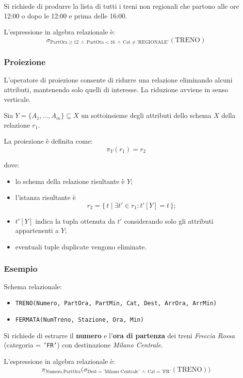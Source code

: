 Si richiede di produrre la lista di tutti i treni non regionali che
partono alle ore 12:00 o dopo le 12:00 e prima delle 16:00.

L'espressione in algebra relazionale è:
\[
\sigma_{\text{PartOra} \ge 12 \;\land\; \text{PartOra} < 16 \;\land\;
	\text{Cat} \neq \text{'REGIONALE'}}(\text{TRENO})
\]
\subsubsection{Proiezione}

L'operatore di proiezione consente di ridurre una relazione eliminando
alcuni attributi, mantenendo solo quelli di interesse.  
La riduzione avviene in senso verticale.

Sia $Y = \{A_1, \dots, A_m\} \subseteq X$ un sottoinsieme degli attributi
dello schema $X$ della relazione $r_1$.

La proiezione è definita come:
\[
\pi_Y(r_1) = r_2
\]

dove:
\begin{itemize}
	\item lo schema della relazione risultante è $Y$;
	\item l'istanza risultante è
	\[
	r_2 = \{\, t \mid \exists t' \in r_1 : t'[Y] = t \,\};
	\]
	\item $t'[Y]$ indica la tupla ottenuta da $t'$ considerando solo gli
	attributi appartenenti a $Y$;
	\item eventuali tuple duplicate vengono eliminate.
\end{itemize}
\subsubsection*{Esempio}

Schema relazionale:
\begin{itemize}
	\item \texttt{TRENO(Numero, PartOra, PartMin, Cat, Dest, ArrOra, ArrMin)}
	\item \texttt{FERMATA(NumTreno, Stazione, Ora, Min)}
\end{itemize}

Si richiede di estrarre il \textbf{numero} e l'\textbf{ora di partenza}
dei treni \textit{Freccia Rossa} (categoria = \texttt{'FR'}) con
destinazione \textit{Milano Centrale}.

L'espressione in algebra relazionale è:
\[
\pi_{\text{Numero}, \text{PartOra}}
\big(
\sigma_{\text{Dest} = \text{'Milano Centrale'} \;\land\;
	\text{Cat} = \text{'FR'}}
(\text{TRENO})
\big)
\]
